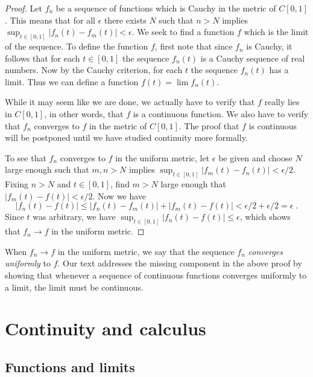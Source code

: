 \documentclass[11pt,oneside]{amsbook}
\theoremstyle{definition}
\theoremstyle{plain}
\theoremstyle{definition}
\theoremstyle{remark}
\numberwithin{equation}{section}
\numberwithin{figure}{section}
\begin{document}
\begin{proof}
  Let $f_n$ be a sequence of functions which is Cauchy in the metric of $C[0,1]$. This means that for all $\epsilon$ there exists $N$ such that $n>N$ implies $\sup_{t\in[0,1]}|f_n(t)-f_m(t)|<\epsilon$. We seek to find a function $f$ which is the limit of the sequence. To define the function $f$, first note that since $f_n$ is Cauchy, it follows that for each $t\in[0,1]$ the sequence $f_n(t)$ is a Cauchy sequence of real numbers. Now by the Cauchy criterion, for each $t$ the sequence $f_n(t)$ has a limit. Thus we can define a function $f(t)=\lim f_n(t)$.

  While it may seem like we are done, we actually have to verify that $f$ really lies in $C[0,1]$, in other words, that $f$ is a continuous function. We also have to verify that $f_n$ converges to $f$ in the metric of $C[0,1]$. The proof that $f$ is continuous will be postponed until we have studied continuity more formally.

  To see that $f_n$ converges to $f$ in the uniform metric, let $\epsilon$ be given and choose $N$ large enough such that $m,n>N$ implies $\sup_{t\in[0,1]}|f_m(t)-f_n(t)|<\epsilon/2$. Fixing $n>N$ and $t\in[0,1]$, find $m>N$ large enough that $|f_m(t)-f(t)|<\epsilon/2$. Now we have
\[|f_n(t)-f(t)|\leq|f_n(t)-f_m(t)|+|f_m(t)-f(t)|<\epsilon/2+\epsilon/2=\epsilon\;.
\]
Since $t$ was arbitrary, we have $\sup_{t\in[0,1]}|f_n(t)-f(t)|\leq\epsilon$, which shows that $f_n\to f$ in the uniform metric.
\end{proof}

When $f_n\to f$ in the uniform metric, we say that the sequence $f_n$ \emph{converges uniformly} to $f$. Our text addresses the missing component in the above proof by showing that whenever a sequence of continuous functions converges uniformly to a limit, the limit must be continuous.


\chapter{Continuity and calculus}

\section{Functions and limits}
\end{document}
